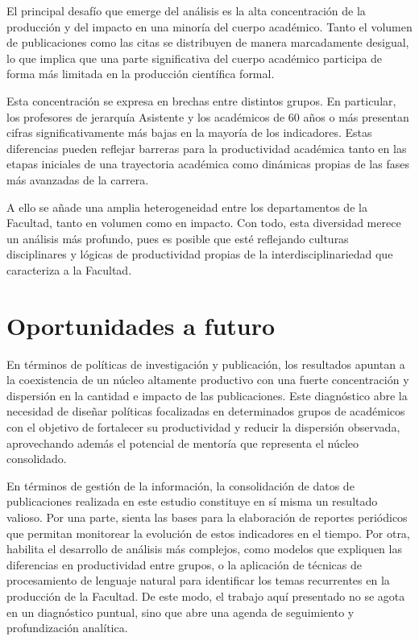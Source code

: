 \documentclass[
  spanish,
  a4paper,
  oneside]{scrbook}
\begin{document}
El principal desafío que emerge del análisis es la alta concentración de
la producción y del impacto en una minoría del cuerpo académico. Tanto
el volumen de publicaciones como las citas se distribuyen de manera
marcadamente desigual, lo que implica que una parte significativa del
cuerpo académico participa de forma más limitada en la producción
científica formal.

Esta concentración se expresa en brechas entre distintos grupos. En
particular, los profesores de jerarquía Asistente y los académicos de 60
años o más presentan cifras significativamente más bajas en la mayoría
de los indicadores. Estas diferencias pueden reflejar barreras para la
productividad académica tanto en las etapas iniciales de una trayectoria
académica como dinámicas propias de las fases más avanzadas de la
carrera.

A ello se añade una amplia heterogeneidad entre los departamentos de la
Facultad, tanto en volumen como en impacto. Con todo, esta diversidad
merece un análisis más profundo, pues es posible que esté reflejando
culturas disciplinares y lógicas de productividad propias de la
interdisciplinariedad que caracteriza a la Facultad.

\section{Oportunidades a futuro}\label{oportunidades-a-futuro-1}

En términos de políticas de investigación y publicación, los resultados
apuntan a la coexistencia de un núcleo altamente productivo con una
fuerte concentración y dispersión en la cantidad e impacto de las
publicaciones. Este diagnóstico abre la necesidad de diseñar políticas
focalizadas en determinados grupos de académicos con el objetivo de
fortalecer su productividad y reducir la dispersión observada,
aprovechando además el potencial de mentoría que representa el núcleo
consolidado.

En términos de gestión de la información, la consolidación de datos de
publicaciones realizada en este estudio constituye en sí misma un
resultado valioso. Por una parte, sienta las bases para la elaboración
de reportes periódicos que permitan monitorear la evolución de estos
indicadores en el tiempo. Por otra, habilita el desarrollo de análisis
más complejos, como modelos que expliquen las diferencias en
productividad entre grupos, o la aplicación de técnicas de procesamiento
de lenguaje natural para identificar los temas recurrentes en la
producción de la Facultad. De este modo, el trabajo aquí presentado no
se agota en un diagnóstico puntual, sino que abre una agenda de
seguimiento y profundización analítica.
\end{document}
